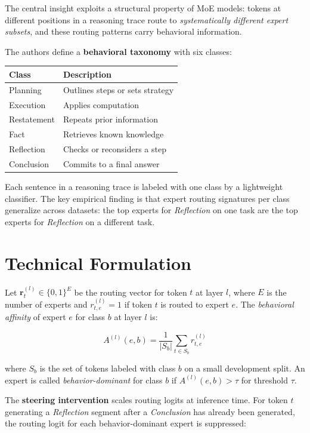 \documentclass[10pt,twocolumn]{article}
\begin{document}
The central insight exploits a structural property of MoE models: tokens at different positions in a reasoning trace route to \emph{systematically different expert subsets}, and these routing patterns carry behavioral information.

The authors define a \textbf{behavioral taxonomy} with six classes:

\begin{center}
\small
\begin{tabular}{ll}
\toprule
\textbf{Class} & \textbf{Description} \\
\midrule
Planning & Outlines steps or sets strategy \\
Execution & Applies computation \\
Restatement & Repeats prior information \\
Fact & Retrieves known knowledge \\
Reflection & Checks or reconsiders a step \\
Conclusion & Commits to a final answer \\
\bottomrule
\end{tabular}
\end{center}

Each sentence in a reasoning trace is labeled with one class by a lightweight classifier.
The key empirical finding is that expert routing signatures per class generalize across datasets: the top experts for \textit{Reflection} on one task are the top experts for \textit{Reflection} on a different task.

\section{Technical Formulation}

Let $\mathbf{r}^{(l)}_t \in \{0,1\}^E$ be the routing vector for token $t$ at layer $l$, where $E$ is the number of experts and $r^{(l)}_{t,e}=1$ if token $t$ is routed to expert $e$.
The \emph{behavioral affinity} of expert $e$ for class $b$ at layer $l$ is:

\begin{equation}
A^{(l)}(e,b) = \frac{1}{|S_b|}\sum_{t \in S_b} r^{(l)}_{t,e}
\end{equation}

where $S_b$ is the set of tokens labeled with class $b$ on a small development split.
An expert is called \emph{behavior-dominant} for class $b$ if $A^{(l)}(e,b) > \tau$ for threshold $\tau$.

The \textbf{steering intervention} scales routing logits at inference time.
For token $t$ generating a \textit{Reflection} segment after a \textit{Conclusion} has already been generated, the routing logit for each behavior-dominant expert is suppressed:
\end{document}
